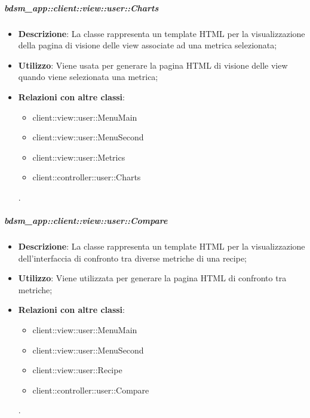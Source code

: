 		\subparagraph{bdsm\_app::client::view::user::Charts} %
		\label{subp:bdsm_app_client_view_user_charts}
			\begin{itemize}
				\item \textbf{Descrizione}: La classe rappresenta un template HTML per la visualizzazione della pagina di visione delle view associate ad una metrica selezionata;
				\item \textbf{Utilizzo}: Viene usata per generare la pagina HTML di visione delle view quando viene selezionata una metrica;
				\item \textbf{Relazioni con altre classi}: 		
					\begin{itemize}
						\item client::view::user::MenuMain
						\item client::view::user::MenuSecond
						\item client::view::user::Metrics
						\item client::controller::user::Charts
					\end{itemize}.
			\end{itemize}

		\subparagraph{bdsm\_app::client::view::user::Compare} %
		\label{subp:bdsm_app_client_view_user_compare}
			\begin{itemize}
				\item \textbf{Descrizione}: La classe rappresenta un template HTML per la visualizzazione dell'interfaccia di confronto tra diverse metriche di una recipe;
				\item \textbf{Utilizzo}: Viene utilizzata per generare la pagina HTML di confronto tra metriche;
				\item \textbf{Relazioni con altre classi}: 		
					\begin{itemize}
						\item client::view::user::MenuMain
						\item client::view::user::MenuSecond
						\item client::view::user::Recipe
						\item client::controller::user::Compare
					\end{itemize}.
			\end{itemize}

